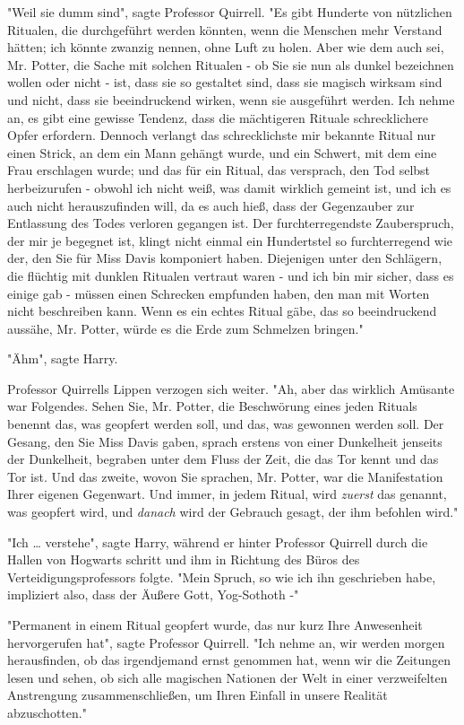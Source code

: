 {"Weil sie dumm sind", sagte Professor Quirrell. "Es gibt Hunderte von nützlichen Ritualen, die durchgeführt werden könnten, wenn die Menschen mehr Verstand hätten; ich könnte zwanzig nennen, ohne Luft zu holen. Aber wie dem auch sei, Mr. Potter, die Sache mit solchen Ritualen - ob Sie sie nun als dunkel bezeichnen wollen oder nicht - ist, dass sie so gestaltet sind, dass sie magisch wirksam sind und nicht, dass sie beeindruckend wirken, wenn sie ausgeführt werden. Ich nehme an, es gibt eine gewisse Tendenz, dass die mächtigeren Rituale schrecklichere Opfer erfordern. Dennoch verlangt das schrecklichste mir bekannte Ritual nur einen Strick, an dem ein Mann gehängt wurde, und ein Schwert, mit dem eine Frau erschlagen wurde; und das für ein Ritual, das versprach, den Tod selbst herbeizurufen - obwohl ich nicht weiß, was damit wirklich gemeint ist, und ich es auch nicht herauszufinden will, da es auch hieß, dass der Gegenzauber zur Entlassung des Todes verloren gegangen ist. Der furchterregendste Zauberspruch, der mir je begegnet ist, klingt nicht einmal ein Hundertstel so furchterregend wie der, den Sie für Miss Davis komponiert haben. Diejenigen unter den Schlägern, die flüchtig mit dunklen Ritualen vertraut waren - und ich bin mir sicher, dass es einige gab - müssen einen Schrecken empfunden haben, den man mit Worten nicht beschreiben kann. Wenn es ein echtes Ritual gäbe, das so beeindruckend aussähe, Mr. Potter, würde es die Erde zum Schmelzen bringen."

"Ähm", sagte Harry.

Professor Quirrells Lippen verzogen sich weiter. "Ah, aber das wirklich Amüsante war Folgendes. Sehen Sie, Mr. Potter, die Beschwörung eines jeden Rituals benennt das, was geopfert werden soll, und das, was gewonnen werden soll. Der Gesang, den Sie Miss Davis gaben, sprach erstens von einer Dunkelheit jenseits der Dunkelheit, begraben unter dem Fluss der Zeit, die das Tor kennt und das Tor ist. Und das zweite, wovon Sie sprachen, Mr. Potter, war die Manifestation Ihrer eigenen Gegenwart. Und immer, in jedem Ritual, wird \emph{zuerst} das genannt, was geopfert wird, und \emph{danach} wird der Gebrauch gesagt, der ihm befohlen wird."

"Ich … verstehe", sagte Harry, während er hinter Professor Quirrell durch die Hallen von Hogwarts schritt und ihm in Richtung des Büros des Verteidigungsprofessors folgte. "Mein Spruch, so wie ich ihn geschrieben habe, impliziert also, dass der Äußere Gott, Yog-Sothoth -"

"Permanent in einem Ritual geopfert wurde, das nur kurz Ihre Anwesenheit hervorgerufen hat", sagte Professor Quirrell. "Ich nehme an, wir werden morgen herausfinden, ob das irgendjemand ernst genommen hat, wenn wir die Zeitungen lesen und sehen, ob sich alle magischen Nationen der Welt in einer verzweifelten Anstrengung zusammenschließen, um Ihren Einfall in unsere Realität abzuschotten."

}
